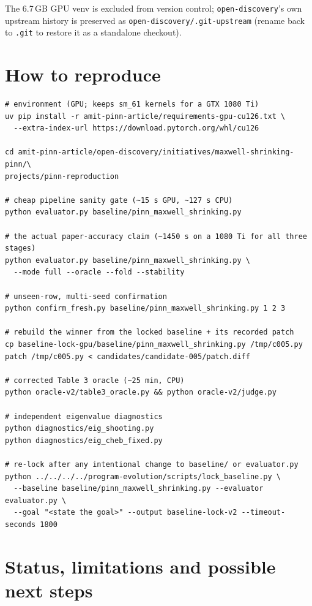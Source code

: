 \documentclass[11pt,a4paper]{article}
\newcommand{\code}[1]{\texttt{\small #1}}
\begin{document}
\noindent The 6.7\,GB GPU venv is excluded from version control; \code{open-discovery}'s own
upstream history is preserved as \code{open-discovery/.git-upstream} (rename back to
\code{.git} to restore it as a standalone checkout).

\section{How to reproduce}

\begin{verbatim}
# environment (GPU; keeps sm_61 kernels for a GTX 1080 Ti)
uv pip install -r amit-pinn-article/requirements-gpu-cu126.txt \
  --extra-index-url https://download.pytorch.org/whl/cu126

cd amit-pinn-article/open-discovery/initiatives/maxwell-shrinking-pinn/\
projects/pinn-reproduction

# cheap pipeline sanity gate (~15 s GPU, ~127 s CPU)
python evaluator.py baseline/pinn_maxwell_shrinking.py

# the actual paper-accuracy claim (~1450 s on a 1080 Ti for all three stages)
python evaluator.py baseline/pinn_maxwell_shrinking.py \
  --mode full --oracle --fold --stability

# unseen-row, multi-seed confirmation
python confirm_fresh.py baseline/pinn_maxwell_shrinking.py 1 2 3

# rebuild the winner from the locked baseline + its recorded patch
cp baseline-lock-gpu/baseline/pinn_maxwell_shrinking.py /tmp/c005.py
patch /tmp/c005.py < candidates/candidate-005/patch.diff

# corrected Table 3 oracle (~25 min, CPU)
python oracle-v2/table3_oracle.py && python oracle-v2/judge.py

# independent eigenvalue diagnostics
python diagnostics/eig_shooting.py
python diagnostics/eig_cheb_fixed.py

# re-lock after any intentional change to baseline/ or evaluator.py
python ../../../../program-evolution/scripts/lock_baseline.py \
  --baseline baseline/pinn_maxwell_shrinking.py --evaluator evaluator.py \
  --goal "<state the goal>" --output baseline-lock-v2 --timeout-seconds 1800
\end{verbatim}

\section{Status, limitations and possible next steps}
\end{document}
